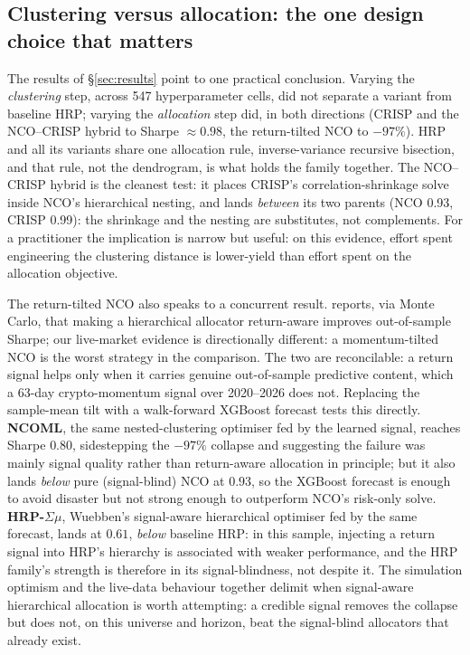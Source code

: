 \documentclass[11pt,a4paper]{article}
\begin{document}
\subsection{Clustering versus allocation: the one design choice that
matters}
The results of \S\ref{sec:results} point to one practical conclusion.
Varying the \emph{clustering} step, across 547 hyperparameter cells,
did not separate a variant from baseline HRP; varying the
\emph{allocation} step did, in both directions (CRISP and the
NCO--CRISP hybrid to Sharpe $\approx0.98$, the return-tilted NCO to
$-97\%$). HRP and all its variants share one allocation rule,
inverse-variance recursive bisection, and that rule, not the
dendrogram, is what holds the family together. The NCO--CRISP hybrid
is the cleanest test: it places CRISP's correlation-shrinkage solve
inside NCO's hierarchical nesting, and lands \emph{between} its two
parents (NCO 0.93, CRISP 0.99): the shrinkage and the nesting are
substitutes, not complements. For a practitioner the implication is
narrow but useful: on this evidence, effort spent engineering the
clustering distance is lower-yield than effort spent on the allocation
objective.

The return-tilted NCO also speaks to a concurrent result.
\citet{wuebben2026crisp} reports, via Monte Carlo, that making a
hierarchical allocator return-aware improves out-of-sample Sharpe; our
live-market evidence is directionally different: a momentum-tilted NCO is
the worst strategy in the comparison. The two are reconcilable: a return
signal helps only when it carries genuine out-of-sample predictive
content, which a 63-day crypto-momentum signal over 2020--2026 does not.
Replacing the sample-mean tilt with a walk-forward XGBoost forecast
tests this directly. \textbf{NCOML}, the same nested-clustering
optimiser fed by the learned signal, reaches Sharpe $0.80$, sidestepping
the $-97\%$ collapse and suggesting the failure was mainly signal quality
rather than return-aware allocation in principle; but it also lands
\emph{below} pure (signal-blind) NCO at $0.93$, so the XGBoost forecast
is enough to avoid disaster but not strong enough to outperform NCO's
risk-only solve. \textbf{HRP-$\Sigma\mu$}, Wuebben's signal-aware
hierarchical optimiser fed by the same forecast, lands at $0.61$,
\emph{below} baseline HRP: in this sample, injecting a return signal into
HRP's hierarchy is associated with weaker performance, and the HRP family's strength is therefore in
its signal-blindness, not despite it. The simulation optimism and the
live-data behaviour together delimit when signal-aware hierarchical
allocation is worth attempting: a credible signal removes the collapse
but does not, on this universe and horizon, beat the signal-blind
allocators that already exist.
\end{document}
